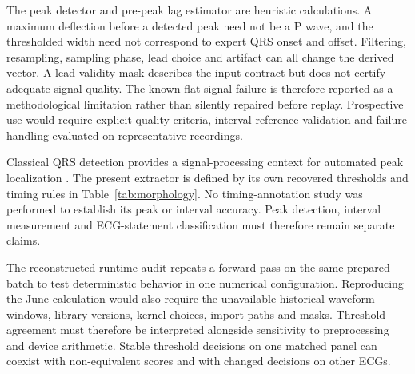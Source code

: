 The peak detector and pre-peak lag estimator are heuristic calculations. A maximum deflection before a detected peak need not be a P wave, and the thresholded width need not correspond to expert QRS onset and offset. Filtering, resampling, sampling phase, lead choice and artifact can all change the derived vector. A lead-validity mask describes the input contract but does not certify adequate signal quality. The known flat-signal failure is therefore reported as a methodological limitation rather than silently repaired before replay. Prospective use would require explicit quality criteria, interval-reference validation and failure handling evaluated on representative recordings.

Classical QRS detection provides a signal-processing context for automated peak localization \citep{Pan1985Real}. The present extractor is defined by its own recovered thresholds and timing rules in Table~\ref{tab:morphology}. No timing-annotation study was performed to establish its peak or interval accuracy. Peak detection, interval measurement and ECG-statement classification must therefore remain separate claims.

The reconstructed runtime audit repeats a forward pass on the same prepared batch to test deterministic behavior in one numerical configuration. Reproducing the June calculation would also require the unavailable historical waveform windows, library versions, kernel choices, import paths and masks. Threshold agreement must therefore be interpreted alongside sensitivity to preprocessing and device arithmetic. Stable threshold decisions on one matched panel can coexist with non-equivalent scores and with changed decisions on other ECGs.
